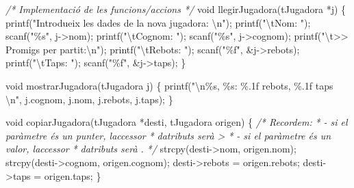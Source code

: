 \documentclass[
]{book}
\newenvironment{Shaded}{\begin{snugshade}}{\end{snugshade}}
\newcommand{\CommentTok}[1]{\textcolor[rgb]{0.56,0.35,0.01}{\textit{#1}}}
\newcommand{\DataTypeTok}[1]{\textcolor[rgb]{0.13,0.29,0.53}{#1}}
\newcommand{\NormalTok}[1]{#1}
\newcommand{\SpecialCharTok}[1]{\textcolor[rgb]{0.00,0.00,0.00}{#1}}
\newcommand{\StringTok}[1]{\textcolor[rgb]{0.31,0.60,0.02}{#1}}
\begin{document}
\begin{Shaded}
\begin{Highlighting}[]
\CommentTok{/* Implementació de les funcions/accions */}
\DataTypeTok{void}\NormalTok{ llegirJugadora(tJugadora *j) \{}
\NormalTok{    printf(}\StringTok{"Introdueix les dades de la nova jugadora: }\SpecialCharTok{\textbackslash{}n}\StringTok{"}\NormalTok{);}
\NormalTok{    printf(}\StringTok{"}\SpecialCharTok{\textbackslash{}t}\StringTok{Nom: "}\NormalTok{);}
\NormalTok{    scanf(}\StringTok{"\%s"}\NormalTok{, j{-}\textgreater{}nom);}
\NormalTok{    printf(}\StringTok{"}\SpecialCharTok{\textbackslash{}t}\StringTok{Cognom: "}\NormalTok{);}
\NormalTok{    scanf(}\StringTok{"\%s"}\NormalTok{, j{-}\textgreater{}cognom);}
\NormalTok{    printf(}\StringTok{"}\SpecialCharTok{\textbackslash{}t}\StringTok{\textgreater{}\textgreater{} Promigs per partit:}\SpecialCharTok{\textbackslash{}n}\StringTok{"}\NormalTok{);}
\NormalTok{    printf(}\StringTok{"}\SpecialCharTok{\textbackslash{}t}\StringTok{Rebots: "}\NormalTok{);}
\NormalTok{    scanf(}\StringTok{"\%f"}\NormalTok{, \&j{-}\textgreater{}rebots);}
\NormalTok{    printf(}\StringTok{"}\SpecialCharTok{\textbackslash{}t}\StringTok{Taps: "}\NormalTok{);}
\NormalTok{    scanf(}\StringTok{"\%f"}\NormalTok{, \&j{-}\textgreater{}taps);}
\NormalTok{\}}

\DataTypeTok{void}\NormalTok{ mostrarJugadora(tJugadora j) \{}
\NormalTok{    printf(}\StringTok{"}\SpecialCharTok{\textbackslash{}n}\StringTok{\%s, \%s: \%.1f rebots, \%.1f taps }\SpecialCharTok{\textbackslash{}n}\StringTok{"}\NormalTok{, j.cognom, j.nom, j.rebots, j.taps);}
\NormalTok{\}}

\DataTypeTok{void}\NormalTok{ copiarJugadora(tJugadora *desti, tJugadora origen) \{}
    \CommentTok{/* Recordem: }
\CommentTok{     * {-} si el paràmetre és un punter, l\textquotesingle{}accessor }
\CommentTok{     *   d\textquotesingle{}atributs serà \textquotesingle{}{-}\textgreater{}\textquotesingle{}}
\CommentTok{     * {-} si el paràmetre és un valor, l\textquotesingle{}accessor}
\CommentTok{     *   d\textquotesingle{}atributs serà \textquotesingle{}.\textquotesingle{}}
\CommentTok{     */}
\NormalTok{    strcpy(desti{-}\textgreater{}nom, origen.nom);}
\NormalTok{    strcpy(desti{-}\textgreater{}cognom, origen.cognom);}
\NormalTok{    desti{-}\textgreater{}rebots = origen.rebots;}
\NormalTok{    desti{-}\textgreater{}taps = origen.taps;}
\NormalTok{\}}


\end{Highlighting}
\end{Shaded}
\end{document}
